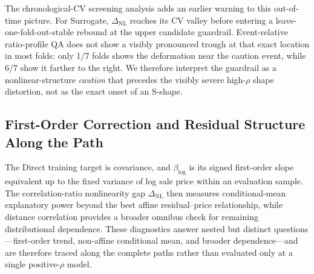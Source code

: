 \documentclass[10pt]{article}
\theoremstyle{definition}
\newcommand{\1}{\mathbf{1}}
\newcommand{\oldtext}[1]{\textcolor{blue}{\sout{#1}}}
\newcommand{\newtext}[1]{\textcolor{impGreen}{#1}}
\newcommand{\latesttext}[1]{\textcolor{latestPurple}{#1}}
\begin{document}
\latesttext{The chronological-CV screening analysis adds an earlier warning to this out-of-time picture. For Surrogate, $\Delta_{\mathrm{NL}}$ reaches its CV valley before entering a leave-one-fold-out-stable rebound at the upper candidate guardrail. Event-relative ratio-profile QA does not show a visibly pronounced trough at that exact location in most folds: only 1/7 folds shows the deformation near the caution event, while 6/7 show it farther to the right. We therefore interpret the guardrail as a nonlinear-structure \emph{caution} that precedes the visibly severe high-$\rho$ shape distortion, not as the exact onset of an S-shape.}

\subsection{
\texorpdfstring{
\newtext{First-Order Correction and Residual Structure Along the Path}}{First-Order Correction and Residual Structure Along the Path}
}
\label{subsec:mechanism_results}


{\color{impGreen}The Direct training target is covariance, and $\beta_{\log}$ is its signed first-order slope equivalent up to the fixed variance of log sale price within an evaluation sample. The correlation-ratio nonlinearity gap $\Delta_{\mathrm{NL}}$ then measures conditional-mean explanatory power beyond the best affine residual--price relationship, while distance correlation provides a broader omnibus check for remaining distributional dependence. These diagnostics answer nested but distinct questions---first-order trend, non-affine conditional mean, and broader dependence---and are therefore traced along the complete paths rather than evaluated only at a single positive-$\rho$ model.}
\end{document}
